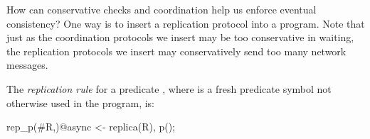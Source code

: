 
%


How can conservative checks and coordination help us enforce eventual consistency?  One way is to insert a  replication protocol into a \lang program.  Note that just as  the coordination protocols we insert may be too conservative in waiting, the replication protocols we insert may conservatively send too many network messages.  


\begin{definition}
The {\em replication rule} for a predicate , where  is a fresh predicate symbol not otherwise used in the program, is:
\begin{Dedalus}
rep_p(#R,)@async <- replica(R), p();
\end{Dedalus}
\end{definition}


